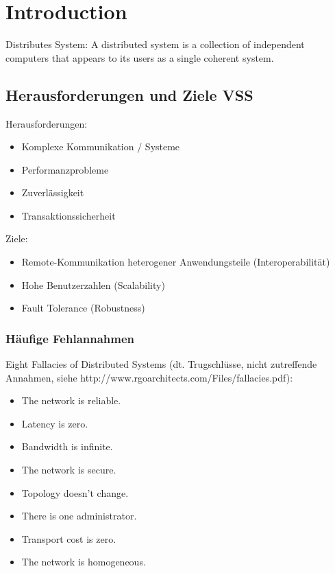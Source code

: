 


\newcommand{\SUBJECT}{Zusammenfassung}
\newcommand{\TITLE}{Verteilte Software Systeme}




\section{Introduction}

Distributes System: A distributed system is a collection of independent computers that appears to its users as a single coherent system.


\subsection{Herausforderungen und Ziele VSS}
Herausforderungen:
\begin{itemize}
	\item Komplexe Kommunikation / Systeme
	\item Performanzprobleme
	\item Zuverlässigkeit
	\item Transaktionssicherheit
\end{itemize}
Ziele:
\begin{itemize}
	\item Remote-Kommunikation heterogener Anwendungsteile (Interoperabilität)
	\item Hohe Benutzerzahlen (Scalability)
	\item Fault Tolerance (Robustness)
\end{itemize}

\subsubsection{Häufige Fehlannahmen}
Eight Fallacies of Distributed Systems (dt. Trugschlüsse, nicht zutreffende Annahmen, siehe http://www.rgoarchitects.com/Files/fallacies.pdf):
\begin{itemize}
	\item The network is reliable.
	\item Latency is zero.
	\item Bandwidth is infinite.
	\item The network is secure.
	\item Topology doesn't change.
	\item There is one administrator.
	\item Transport cost is zero.
	\item The network is homogeneous.
\end{itemize}

